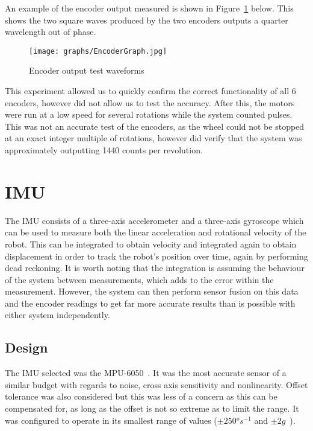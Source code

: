 An example of the encoder output measured is shown in Figure~\ref{EncoderGraph} below. This shows the two square waves produced by the
two encoders outputs a quarter wavelength out of phase.

\begin{figure}[!ht]
	\centering
	\texttt{[image: graphs/EncoderGraph.jpg]}
	\caption{Encoder output test waveforms}\label{EncoderGraph}

\end{figure}

This experiment allowed us to quickly confirm the correct functionality
of all 6 encoders, however did not allow us to test the accuracy. After
this, the motors were run at a low speed for several rotations while the
system counted pulses. This was not an accurate test of the encoders, as
the wheel could not be stopped at an exact integer multiple of rotations,
however did verify that the system was approximately outputting 1440
counts per revolution.

\section{IMU}\label{elec/imu}
The IMU consists of a three-axis accelerometer and a three-axis gyroscope
which can be used to measure both the linear acceleration and rotational
velocity of the robot. This can be integrated to obtain velocity and integrated again
to obtain displacement in order to track the robot's position over time, again by performing dead reckoning. It is worth noting
that the integration is assuming the behaviour of the system between measurements, which adds to the error within the measurement. However, the
system can then perform sensor fusion on this data and the encoder
readings to get far more accurate results than is possible with either system
independently.

\subsection{Design}\label{elec/imu/design}
The IMU selected was the MPU-6050~\cite{MPU6050Datasheet}. It was the most accurate sensor of a
similar budget with regards to noise, cross axis sensitivity and nonlinearity. 
Offset tolerance was also considered but this was less of a
concern as this can be compensated for, as long as the offset is not
so extreme as to limit the range. It was configured to operate in its
smallest range of values ($\pm\ang{250}s^{-1}$ and $\pm2g$~\cite{MPU6050Datasheet}).

